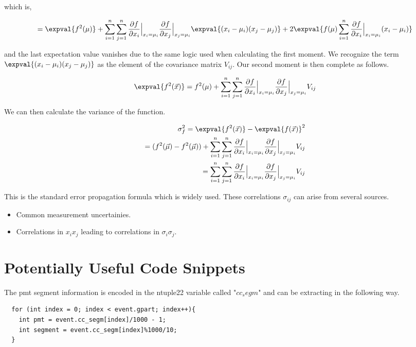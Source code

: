 which is, 

\begin{equation}
        = \expval{f^2(\mu)} + \sum_{i=1}^{n} \sum_{j=1}^{n} \frac{\partial f}{\partial x_i} \Bigr|_{x_i = \mu_i} \frac{\partial f}{\partial x_j} \Bigr|_{x_j = \mu_i} \expval{(x_i - \mu_i)(x_j - \mu_j)} + 2 \expval{f(\mu) \sum_{i=1}^{n} \frac{\partial f}{\partial x_i} \Bigr|_{x_i = \mu_i} (x_i-\mu_i)}
\end{equation}

and the last expectation value vanishes due to the same logic used when calculating the first moment.  We recognize the term $\expval{(x_i - \mu_i)(x_j - \mu_j)}$ as the element of the covariance matrix $V_{ij}$.  Our second moment is then complete as follows.

\begin{equation}
        \expval{f^2(\vec{x})}  = f^2(\mu) + \sum_{i=1}^{n} \sum_{j=1}^{n} \frac{\partial f}{\partial x_i} \Bigr|_{x_i = \mu_i} \frac{\partial f}{\partial x_j} \Bigr|_{x_j = \mu_i} V_{ij}
\end{equation}

We can then calculate the variance of the function.

\begin{align} 
    \sigma_{f}^2 = \expval{f^2(\vec{x})} - \expval{f(\vec{x})}^2 \\ 
    = (f^2(\vec{\mu}) - f^2(\vec{\mu})) + \sum_{i=1}^{n} \sum_{j=1}^{n} \frac{\partial f}{\partial x_i} \Bigr|_{x_i = \mu_i} \frac{\partial f}{\partial x_j} \Bigr|_{x_j = \mu_i} V_{ij} \\
    = \sum_{i=1}^{n} \sum_{j=1}^{n} \frac{\partial f}{\partial x_i} \Bigr|_{x_i = \mu_i} \frac{\partial f}{\partial x_j} \Bigr|_{x_j = \mu_i} V_{ij} 
\end{align}

This is the standard error propagation formula which is widely used.  These correlations $\sigma_{ij}$ can arise from several sources.

\begin{itemize}
    \item{Common measurement uncertainies.}
    \item{Correlations in $x_i x_j$ leading to correlations in $\sigma_i \sigma_j$.}
\end{itemize}

\section{Potentially Useful Code Snippets}
The pmt segment information is encoded in the ntuple22 variable called "$cc_segm$" and can be extracting in the following way. 

\begin{lstlisting}
  for (int index = 0; index < event.gpart; index++){
    int pmt = event.cc_segm[index]/1000 - 1;
    int segment = event.cc_segm[index]%1000/10; 
  }
\end{lstlisting}
